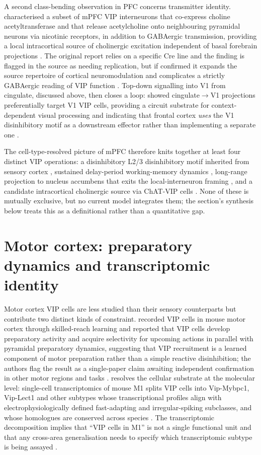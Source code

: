 \documentclass[11pt]{article}
\let\origrightarrow\rightarrow
\def\rightarrow{\ensuremath{\origrightarrow}}
\begin{document}
A second class-bending observation in PFC concerns transmitter identity. \citet{Obermayer2019} characterised a subset of mPFC VIP interneurons that co-express choline acetyltransferase and that release acetylcholine onto neighbouring pyramidal neurons via nicotinic receptors, in addition to GABAergic transmission, providing a local intracortical source of cholinergic excitation independent of basal forebrain projections \citep{Obermayer2019, Wall2016}. The original report relies on a specific Cre line and the finding is flagged in the source as needing replication, but if confirmed it expands the source repertoire of cortical neuromodulation and complicates a strictly GABAergic reading of VIP function \citep{Obermayer2019}. Top-down signalling into V1 from cingulate, discussed above, then closes a loop: \citet{Bastos2023a} showed cingulate\rightarrow V1 projections preferentially target V1 VIP cells, providing a circuit substrate for context-dependent visual processing and indicating that frontal cortex \textit{uses} the V1 disinhibitory motif as a downstream effector rather than implementing a separate one \citep{Bastos2023a, Wall2016}.

The cell-type-resolved picture of mPFC therefore knits together at least four distinct VIP operations: a disinhibitory L2/3 disinhibitory motif inherited from sensory cortex \citep{Pi2013, Anastasiades2021a}, sustained delay-period working-memory dynamics \citep{Kamigaki2017}, long-range projection to nucleus accumbens that exits the local-interneuron framing \citep{Lee2014b}, and a candidate intracortical cholinergic source via ChAT-VIP cells \citep{Obermayer2019}. None of these is mutually exclusive, but no current model integrates them; the section's synthesis below treats this as a definitional rather than a quantitative gap.

\section{Motor cortex: preparatory dynamics and transcriptomic identity}

Motor cortex VIP cells are less studied than their sensory counterparts but contribute two distinct kinds of constraint. \citet{Arroyo2023} recorded VIP cells in mouse motor cortex through skilled-reach learning and reported that VIP cells develop preparatory activity and acquire selectivity for upcoming actions in parallel with pyramidal preparatory dynamics, suggesting that VIP recruitment is a learned component of motor preparation rather than a simple reactive disinhibition; the authors flag the result as a single-paper claim awaiting independent confirmation in other motor regions and tasks \citep{Arroyo2023}. \citet{Scala2021} resolves the cellular substrate at the molecular level: single-cell transcriptomics of mouse M1 splits VIP cells into Vip-Mybpc1, Vip-Lect1 and other subtypes whose transcriptional profiles align with electrophysiologically defined fast-adapting and irregular-spiking subclasses, and whose homologues are conserved across species \citep{Scala2021}. The transcriptomic decomposition implies that ``VIP cells in M1'' is not a single functional unit and that any cross-area generalisation needs to specify which transcriptomic subtype is being assayed \citep{Scala2021}.
\end{document}
